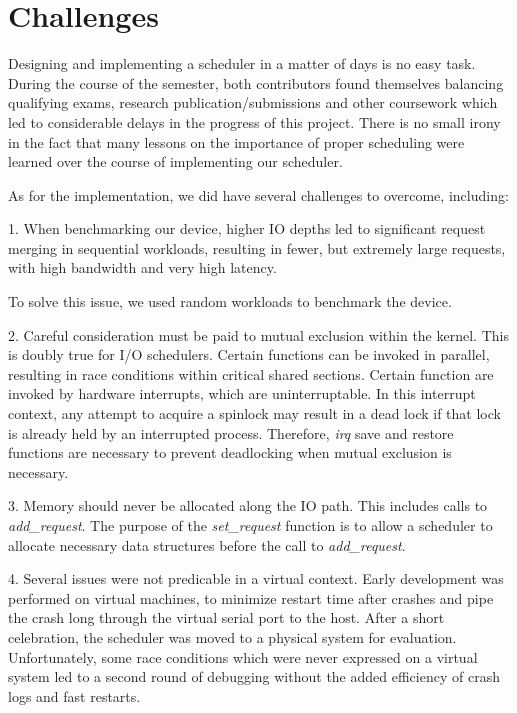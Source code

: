 \section{Challenges}

Designing and implementing a scheduler in a matter of days is no easy
task. During the course of the semester, both contributors found
themselves balancing qualifying exams, research
publication/submissions and other coursework which led to considerable
delays in the progress of this project. There is no small irony in the
fact that many lessons on the importance of proper scheduling were
learned over the course of implementing our scheduler.

As for the implementation, we did have several challenges to overcome, including:

1. When benchmarking our device, higher IO depths led to significant
request merging in sequential workloads, resulting in fewer, but
extremely large requests, with high bandwidth and very high latency.
    
To solve this issue, we used random workloads to benchmark the device.

2. Careful consideration must be paid to mutual exclusion within the
kernel. This is doubly true for I/O schedulers. Certain functions can
be invoked in parallel, resulting in race conditions within critical
shared sections. Certain function are invoked by hardware interrupts,
which are uninterruptable. In this interrupt context, any attempt to
acquire a spinlock may result in a dead lock if that lock is already
held by an interrupted process. Therefore, \emph{irq} save and restore
functions are necessary to prevent deadlocking when mutual exclusion
is necessary.

3. Memory should never be allocated along the IO path. This includes
calls to \emph{add\_request}. The purpose of the \emph{set\_request}
function is to allow a scheduler to allocate necessary data structures
before the call to \emph{add\_request}. 

4. Several issues were not predicable in a virtual context. Early
development was performed on virtual machines, to minimize restart
time after crashes and pipe the crash long through the virtual serial
port to the host. After a short celebration, the scheduler was moved
to a physical system for evaluation. Unfortunately, some race
conditions which were never expressed on a virtual system led to a
second round of debugging without the added efficiency of crash logs
and fast restarts.
